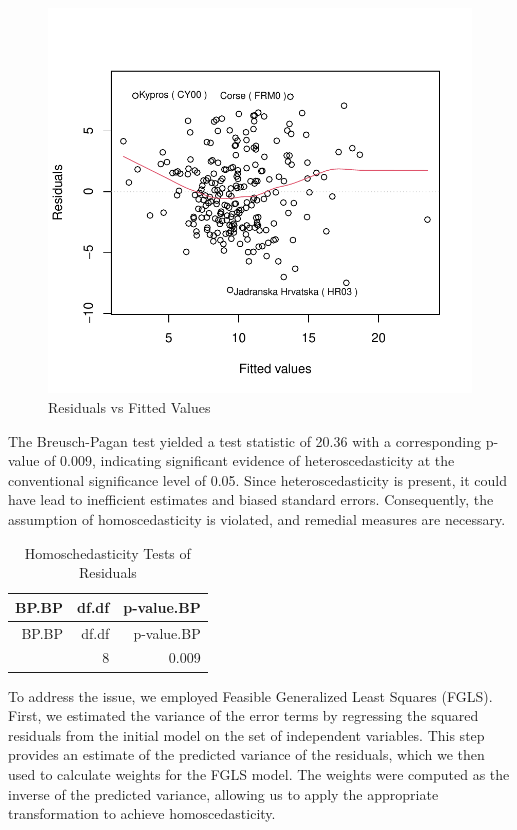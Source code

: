 \documentclass[
  letterpaper,
  DIV=11,
  numbers=noendperiod,
  abstract]{scrartcl}
\begin{document}
\begin{figure}[H]

{\centering \includegraphics[width=1\textwidth,height=\textheight]{report_files/figure-pdf/residualsvsfitted-1.pdf}

}

\caption{Residuals vs Fitted Values}

\end{figure}%

The Breusch-Pagan test yielded a test statistic of 20.36 with a
corresponding p-value of 0.009, indicating significant evidence of
heteroscedasticity at the conventional significance level of 0.05. Since
heteroscedasticity is present, it could have lead to inefficient
estimates and biased standard errors. Consequently, the assumption of
homoscedasticity is violated, and remedial measures are necessary.

\begin{longtable}[]{@{}rrr@{}}
\caption{Homoschedasticity Tests of Residuals}\tabularnewline
\toprule\noalign{}
BP.BP & df.df & p-value.BP \\
\midrule\noalign{}
\endfirsthead
\toprule\noalign{}
BP.BP & df.df & p-value.BP \\
\midrule\noalign{}
\endhead
\bottomrule\noalign{}
\endlastfoot
20.363 & 8 & 0.009 \\
\end{longtable}

To address the issue, we employed Feasible Generalized Least Squares
(FGLS). First, we estimated the variance of the error terms by
regressing the squared residuals from the initial model on the set of
independent variables. This step provides an estimate of the predicted
variance of the residuals, which we then used to calculate weights for
the FGLS model. The weights were computed as the inverse of the
predicted variance, allowing us to apply the appropriate transformation
to achieve homoscedasticity.
\end{document}
